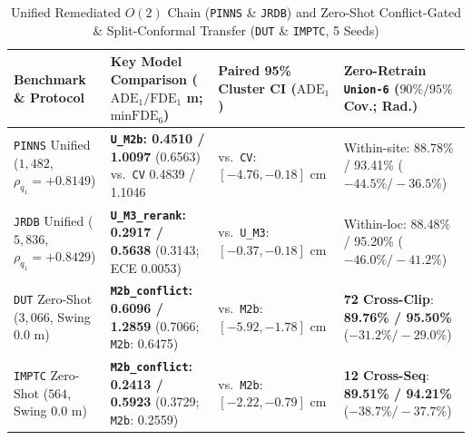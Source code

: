 \documentclass[journal]{IEEEtran}
\begin{document}
\begin{table}[!t]
\centering
\caption{Unified Remediated $O(2)$ Chain (\texttt{PINNS} \& \texttt{JRDB}) and Zero-Shot Conflict-Gated \& Split-Conformal Transfer (\texttt{DUT} \& \texttt{IMPTC}, 5 Seeds)}
\label{tab:unified_transfer}
\footnotesize
\begin{tabular}{llll}
\toprule
Benchmark \& Protocol & Key Model Comparison ($\text{ADE}_1 / \text{FDE}_1$ m; $\text{minFDE}_6$) & Paired 95\% Cluster CI ($\text{ADE}_1$) & Zero-Retrain \texttt{Union-6} ($90\% / 95\%$ Cov.; Rad.) \\
\midrule
\texttt{PINNS} Unified ($1{,}482$, $\rho_{q_1}{=}{+0.8149}$) & \textbf{\texttt{U\_M2b}: 0.4510 / 1.0097} (0.6563) vs.\ \texttt{CV} 0.4839 / 1.1046 & vs.\ \texttt{CV}: $[-4.76, -0.18]\text{ cm}$ & Within-site: 88.78\% / 93.41\% ($-44.5\% / -36.5\%$) \\
\texttt{JRDB} Unified ($5{,}836$, $\rho_{q_1}{=}{+0.8429}$) & \textbf{\texttt{U\_M3\_rerank}: 0.2917 / 0.5638} (0.3143; ECE 0.0053) & vs.\ \texttt{U\_M3}: $[-0.37, -0.18]\text{ cm}$ & Within-loc: 88.48\% / 95.20\% ($-46.0\% / -41.2\%$) \\
\texttt{DUT} Zero-Shot ($3{,}066$, Swing $0.0\text{ m}$) & \textbf{\texttt{M2b\_conflict}: 0.6096 / 1.2859} (0.7066; \texttt{M2b}: 0.6475) & vs.\ \texttt{M2b}: $[-5.92, -1.78]\text{ cm}$ & \textbf{72 Cross-Clip}: \textbf{89.76\% / 95.50\%} ($-31.2\% / -29.0\%$) \\
\texttt{IMPTC} Zero-Shot ($564$, Swing $0.0\text{ m}$) & \textbf{\texttt{M2b\_conflict}: 0.2413 / 0.5923} (0.3729; \texttt{M2b}: 0.2559) & vs.\ \texttt{M2b}: $[-2.22, -0.79]\text{ cm}$ & \textbf{12 Cross-Seq}: \textbf{89.51\% / 94.21\%} ($-38.7\% / -37.7\%$) \\
\bottomrule
\end{tabular}
\end{table}
\end{document}
